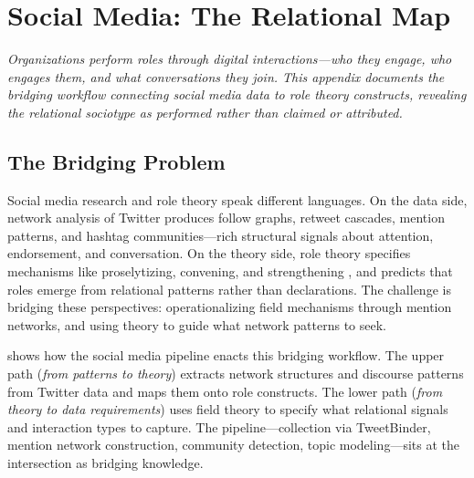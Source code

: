 \documentclass[../main.tex]{subfiles}
\begin{document}

\chapter{Social Media: The Relational Map}
\label{app:social-media}

\noindent\textit{Organizations perform roles through digital interactions---who they engage,
who engages them, and what conversations they join.
This appendix documents the bridging workflow connecting social media data
to role theory constructs, revealing the relational sociotype as performed
rather than claimed or attributed.}

\bigskip


\section{The Bridging Problem}

Social media research and role theory speak different languages.
On the data side, network analysis of Twitter produces follow graphs,
retweet cascades, mention patterns, and hashtag communities---rich structural
signals about attention, endorsement, and conversation.
On the theory side, role theory specifies mechanisms like proselytizing,
convening, and strengthening \parencite{powell2017organizational}, and
predicts that roles emerge from relational patterns rather than declarations.
The challenge is bridging these perspectives: operationalizing field mechanisms
through mention networks, and using theory to guide what network patterns to seek.

 shows how the \RoleBox{} social media pipeline
enacts this bridging workflow.
The upper path (\textit{from patterns to theory}) extracts network structures
and discourse patterns from Twitter data and maps them onto role constructs.
The lower path (\textit{from theory to data requirements}) uses field theory
to specify what relational signals and interaction types to capture.
The pipeline---collection via TweetBinder, mention network construction,
community detection, topic modeling---sits at the intersection as bridging knowledge.
\end{document}
